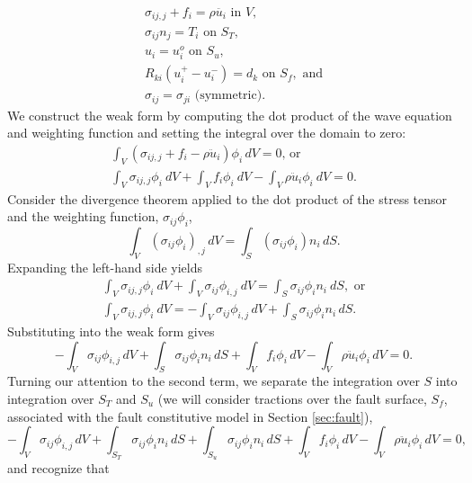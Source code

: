 \begin{gather}
\sigma_{ij,j}+f_{i}=\rho\ddot{u_{i}}\text{ in }V,\\
\sigma_{ij}n_{j}=T_{i}\text{ on }S_{T},\\
u_{i}=u_{i}^{o}\text{ on }S_{u},\\
R_{ki}(u_{i}^{+}-u_{i}^{-})=d_{k}\text{ on }S_{f},\text{ and}\\
\sigma_{ij}=\sigma_{ji}\text{ (symmetric).}
\end{gather}
We construct the weak form by computing the dot product of the wave
equation and weighting function and setting the integral over the
domain to zero:
\begin{gather}
\int_{V}\left(\sigma_{ij,j}+f_{i}-\rho\ddot{u}_{i}\right)\phi_{i}\, dV=0\text{, or }\\
\int_{V}\sigma_{ij,j}\phi_{i}\: dV+\int_{V}f_{i}\phi_{i}\: dV-\int_{V}\rho\ddot{u}_{i}\phi_{i}\: dV=0.
\end{gather}
 Consider the divergence theorem applied to the dot product of the
stress tensor and the weighting function, $\sigma_{ij}\phi_{i}$,
\begin{equation}
\int_{V}(\sigma_{ij}\phi_{i})_{,j}\, dV=\int_{S}(\sigma_{ij}\phi_{i})n_{i}\, dS.
\end{equation}
Expanding the left-hand side yields
\begin{gather}
\int_{V}\sigma_{ij,j}\phi_{i}\: dV+\int_{V}\sigma_{ij}\phi_{i,j}\: dV=\int_{S}\sigma_{ij}\phi_{i}n_{i}\: dS,\text{ or}\\
\int_{V}\sigma_{ij,j}\phi_{i}\: dV=-\int_{V}\sigma_{ij}\phi_{i,j}\, dV+\int_{S}\sigma_{ij}\phi_{i}n_{i}\, dS.
\end{gather}
Substituting into the weak form gives
\begin{equation}
-\int_{V}\sigma_{ij}\phi_{i,j}\, dV+\int_{S}\sigma_{ij}\phi_{i}n_{i}\, dS+\int_{V}f_{i}\phi_{i}\, dV-\int_{V}\rho\ddot{u}_{i}\phi_{i}\, dV=0.
\end{equation}
Turning our attention to the second term, we separate the integration
over $S$ into integration over $S_{T}$ and $S_{u}$ (we will consider
tractions over the fault surface, $S_{f}$, associated with the fault
constitutive model in Section \ref{sec:fault}),
\begin{equation}
-\int_{V}\sigma_{ij}\phi_{i,j}\, dV+\int_{S_{T}}\sigma_{ij}\phi_{i}n_{i}\, dS+\int_{S_{u}}\sigma_{ij}\phi_{i}n_{i}\, dS+\int_{V}f_{i}\phi_{i}\, dV-\int_{V}\rho\ddot{u}_{i}\phi_{i}\, dV=0,
\end{equation}
and recognize that
